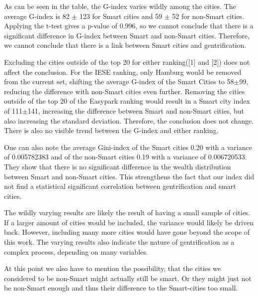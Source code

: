 \documentclass[a4paper, 10pt]{IEEEconf}      %
\begin{document}
As can be seen in the table, the G-index varies wildly among the cities. The average G-index is 82 $\pm$ 123 for Smart cities and 59 $\pm$ 52 for non-Smart cities. Applying the t-test gives a p-value of 0.996, so we cannot conclude that there is a significant difference in G-index between Smart and non-Smart cities. Therefore, we cannot conclude that there is a link between Smart cities and gentrification.

Excluding the cities outside of the top 20 for either ranking([1] and [2]) does not affect the conclusion. For the IESE ranking, only Hamburg would be removed from the current set, shifting the average G-index of the Smart Cities to 58$\pm$99, reducing the difference with non-Smart cities even further. Removing the cities outside of the top 20 of the Easypark ranking would result in a Smart city index of 111$\pm$141, increasing the difference between Smart and non-Smart cities, but also increasing the standard deviation. Therefore, the conclusion does not change. There is also no visible trend between the G-index and either ranking.

One can also note the average Gini-index of the Smart cities 0.20 with a variance of 0.005782383 and of the non-Smart cities 0.19 with a variance of 0.006720533. They show that there is no significant difference in the wealth distribution between Smart and non-Smart cities. This strengthens the fact that our index did not find a statistical significant correlation between gentrification and smart cities. 

The wildly varying results are likely the result of having a small sample of cities. If a larger amount of cities would be included, the variance would likely be driven back. However, including many more cities would have gone beyond the scope of this work. The varying results also indicate the nature of gentrification as a complex process, depending on many variables.

At this point we also have to mention the possibility, that the cities we considered to be non-Smart might actually still be smart. Or they might just not be non-Smart enough and thus their difference to the Smart-cities too small. 
\end{document}
